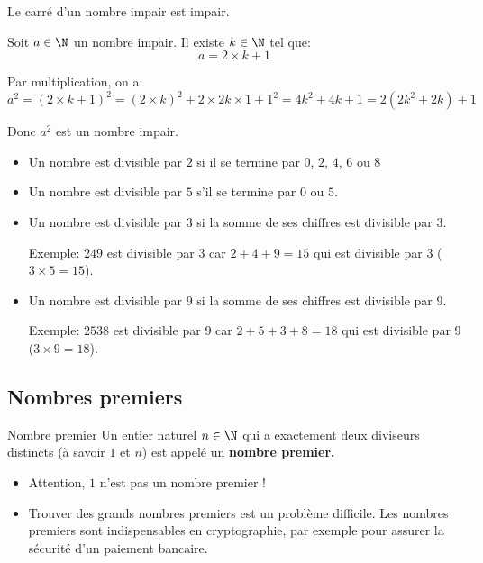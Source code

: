\begin{prop}{}{}
Le carré d'un nombre impair est impair.
\end{prop}

\begin{deme}{}{}
Soit $a\in\N$ un nombre impair. Il existe $k\in\N$ tel que:
$$ a =2\times k+1 $$

Par multiplication, on a:
$$ a^2 = \left(2\times k+1 \right)^2 = (2\times k)^2 + 2 \times 2k \times 1 + 1^2 = 4k^2 + 4k +1 = 2(2k^2+2k)+1$$

Donc $a^2$ est un nombre impair. 
\end{deme}

\begin{prop}{}{}
\begin{itemize}
\item  Un nombre est divisible par $2$ si il se termine par $0$, $2$, $4$, $6$ ou $8$
\item  Un nombre est divisible par $5$ s'il se termine par $0$ ou $5$.

\item  Un nombre est divisible par $3$ si la somme de ses chiffres est divisible par $3$.

Exemple: $249$ est divisible par $3$ car $2 + 4 + 9 = 15$ qui est divisible par $3$ ($3 \times 5 = 15$).

\item  Un nombre est divisible par $9$ si la somme de ses chiffres est divisible par $9$.

Exemple: $2 538$ est divisible par $9$ car $2 + 5 + 3 + 8 = 18$ qui est divisible par $9$ ($3 \times 9 = 18$).
\end{itemize}
\end{prop}

\subsection{Nombres premiers}
\begin{defi}{Nombre premier}{}
Un entier naturel $n\in\N$ qui a exactement deux diviseurs distincts (à savoir $1$ et $n$) est appelé un \bf{nombre premier}. 
\end{defi}

\begin{rems}{}{}
	\begin{itemize}
		\item Attention, $1$ n'est pas un nombre premier !
		\item 
		Trouver des grands nombres premiers est un problème difficile. Les nombres premiers sont indispensables en cryptographie, par exemple pour assurer la sécurité d'un paiement bancaire.
	\end{itemize}
\end{rems}

